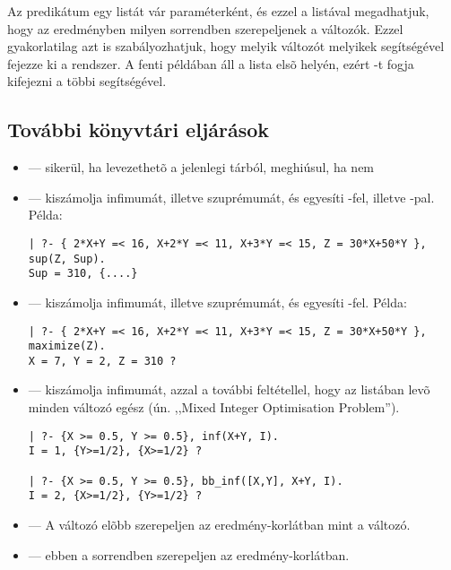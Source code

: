 Az  predikátum egy listát vár paraméterként, és ezzel a
listával megadhatjuk, hogy az eredményben milyen sorrendben szerepeljenek
a változók. Ezzel gyakorlatilag azt is szabályozhatjuk, hogy melyik változót
melyikek segítségével fejezze ki a rendszer. A fenti példában  áll a
lista elsõ helyén, ezért -t fogja kifejezni a többi segítségével.

\subsection{További könyvtári eljárások}

\begin{itemize}
\item {} --- sikerül, ha  levezethetõ a
jelenlegi tárból, meghiúsul, ha nem

\item {} --- kiszámolja  infimumát,
illetve szuprémumát, és egyesíti -fel, illetve -pal.
Példa:

\begin{verbatim}
| ?- { 2*X+Y =< 16, X+2*Y =< 11, X+3*Y =< 15, Z = 30*X+50*Y }, sup(Z, Sup).
Sup = 310, {....}
\end{verbatim}

\item {} --- kiszámolja  infimumát,
illetve szuprémumát, és egyesíti -fel. Példa:

\begin{verbatim}
| ?- { 2*X+Y =< 16, X+2*Y =< 11, X+3*Y =< 15, Z = 30*X+50*Y }, maximize(Z).
X = 7, Y = 2, Z = 310 ?
\end{verbatim}

\item {} --- kiszámolja  infimumát,
azzal a további feltétellel, hogy az  listában levõ minden
változó egész (ún. ,,Mixed Integer Optimisation Problem'').

\begin{verbatim}
| ?- {X >= 0.5, Y >= 0.5}, inf(X+Y, I).
I = 1, {Y>=1/2}, {X>=1/2} ?

| ?- {X >= 0.5, Y >= 0.5}, bb_inf([X,Y], X+Y, I).
I = 2, {X>=1/2}, {Y>=1/2} ?
\end{verbatim}

\item {} --- A  változó elõbb szerepeljen az
eredmény-korlátban mint a  változó.

\item {} ---  ebben a sorrendben
szerepeljen az eredmény-korlátban.

\end{itemize}

